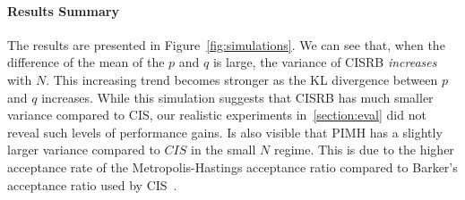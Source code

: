 \paragraph{Results Summary}
The results are presented in Figure~\ref{fig:simulations}.
We can see that, when the difference of the mean of the \(p\) and \(q\) is large, the variance of CISRB \textit{increases} with \(N\).
This increasing trend becomes stronger as the KL divergence between \(p\) and \(q\) increases.
While this simulation suggests that CISRB has much smaller variance compared to CIS, our realistic experiments in~\cref{section:eval} did not reveal such levels of performance gains.
Is also visible that PIMH has a slightly larger variance compared to \(CIS\) in the small \(N\) regime.
This is due to the higher acceptance rate of the Metropolis-Hastings acceptance ratio compared to Barker's acceptance ratio used by CIS~\citep{peskun_optimum_1973, minh_understanding_2015}.

